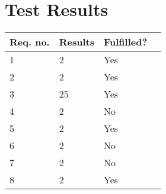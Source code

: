 \section{Test Results}\label{cha:TestProcedure}

\begin{table}[H] \centering
\begin{tabular}{|p{2cm}|p{5cm}|p{6cm}|p{3cm}|}
\hline%
\textbf{Req. no.}  &  \textbf{Results} &  \textbf{Fulfilled?}         \\
\hline%
           1    &   2   &   Yes               \\
\hline%
           2    &   2  &  Yes                \\
\hline%
           3    &   25   &  Yes            \\
\hline%
           4    &   2   &   No                \\
\hline%
           5    &   2 &   Yes              \\
\hline%
           6    &   2  &    No                \\
\hline%
           7    &   2   &   No            \\ 
\hline%
           8    &   2  &    Yes              \\
\hline%
\end{tabular}
\label{tab:AcceptTestTestResults}
\end{table}

